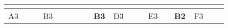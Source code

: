\begin{landscape}
\begin{table}[h!]
\begin{tabular}{lcllcllcllcllcllcl}
                          & \multicolumn{1}{l}{}                                                                                                     &                              &                                                 & \multicolumn{1}{l}{}                                                                                                                                &                                                       &                         & \multicolumn{1}{l}{}                                                                                                     &                               &                                                 & \multicolumn{1}{l}{}                                                                                                                      &                                                       &                         & \multicolumn{1}{l}{}                                                                                                                &                               &                                                 & \multicolumn{1}{l}{}                                                                                                                                  &                                                       \\ \hline
\multicolumn{1}{|l|}{A3}  & \multicolumn{1}{c|}{}                                                                                                    & \multicolumn{1}{l|}{}        & \multicolumn{1}{l|}{\cellcolor[HTML]{C0C0C0}B3} & \multicolumn{1}{c|}{\cellcolor[HTML]{C0C0C0}}                                                                                                       & \multicolumn{1}{l|}{\cellcolor[HTML]{C0C0C0}{\bf A4}} & \multicolumn{1}{l|}{}   & \multicolumn{1}{c|}{}                                                                                                    & \multicolumn{1}{l|}{{\bf B3}} & \multicolumn{1}{l|}{\cellcolor[HTML]{C0C0C0}D3} & \multicolumn{1}{c|}{\cellcolor[HTML]{C0C0C0}}                                                                                             & \multicolumn{1}{l|}{\cellcolor[HTML]{C0C0C0}{\bf B2}} & \multicolumn{1}{l|}{E3} & \multicolumn{1}{c|}{}                                                                                                               & \multicolumn{1}{l|}{{\bf B2}} & \multicolumn{1}{l|}{\cellcolor[HTML]{C0C0C0}F3} & \multicolumn{1}{c|}{\cellcolor[HTML]{C0C0C0}}                                                                                                         & \multicolumn{1}{l|}{\cellcolor[HTML]{C0C0C0}{\bf E1}} \\ \cline{1-1} \cline{3-4} \cline{6-7} \cline{9-10} \cline{12-13} \cline{15-16} \cline{18-18} 

\end{tabular}
\end{table}
\end{landscape}
